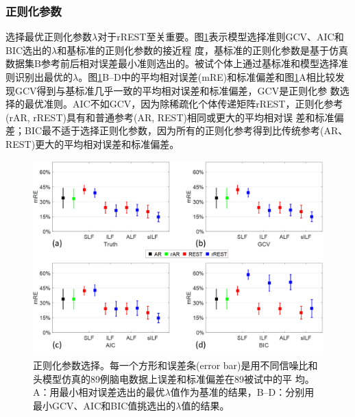 \subsubsection{正则化参数}
选择最优正则化参数$\lambda$对于rREST至关重要。图\ref{3:6}表示模型选择准则GCV、AIC和BIC选出的$\lambda$和基标准的正则化参数的接近程
度，基标准的正则化参数是基于仿真数据集B参考前后相对误差最小准则选出的。被试个体上通过基标准和模型选择准则识别出最优的$\lambda$。图\ref{3:6}B–D中的平均相对误差(mRE)和标准偏差和图\ref{3:6}A相比较发现GCV得到与基标准几乎一致的平均相对误差和标准偏差，GCV是正则化参
数选择的最优准则。AIC不如GCV，因为除稀疏化个体传递矩阵rREST，正则化参考(rAR, rREST)具有和普通参考(AR, REST)相同或更大的平均相对误
差和标准偏差；BIC最不适于选择正则化参数，因为所有的正则化参考得到比传统参考(AR、REST)更大的平均相对误差和标准偏差。
\begin{figure}[!h]
	\centering
	\includegraphics[width=15cm]{pic/Frontier/figure6.png}
	\caption{正则化参数选择。每一个方形和误差条(error bar)是用不同信噪比和头模型仿真的89例脑电数据上误差和标准偏差在89被试中的平
	均。A：用最小相对误差选出的最优$\lambda$值作为基准的结果，B–D：分别用最小GCV、AIC和BIC值挑选出的$\lambda$值的结果。}
	\label{3:6}
\end{figure}

